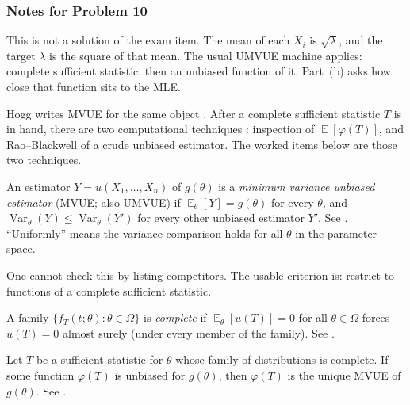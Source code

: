 \documentclass[11pt,a4paper]{article}
\DeclareMathOperator{\Var}{Var}
\DeclareMathOperator{\E}{\mathbb{E}}
\begin{document}
\setcounter{section}{10}
\setcounter{definition}{0}

\subsubsection{Notes for Problem 10}

This is not a solution of the exam item. The mean of each \(X_i\) is \(\sqrt{\lambda}\), and the target \(\lambda\) is the square of that mean. The usual UMVUE machine applies: complete sufficient statistic, then an unbiased function of it. Part~(b) asks how close that function sits to the MLE.

Hogg writes MVUE for the same object \citep[Definition~7.1.1]{hogg2019}. After a complete sufficient statistic \(T\) is in hand, there are two computational techniques \citep[\S7.6]{hogg2019}: inspection of \(\E[\varphi(T)]\), and Rao--Blackwell of a crude unbiased estimator. The worked items below are those two techniques.

\begin{definition}
\label{def:mvue}
An estimator \(Y=u(X_1,\dots,X_n)\) of \(g(\theta)\) is a \emph{minimum variance unbiased estimator} (MVUE; also UMVUE) if \(\E_\theta[Y]=g(\theta)\) for every \(\theta\), and \(\Var_\theta(Y)\le\Var_\theta(Y')\) for every other unbiased estimator \(Y'\). See \citep[Definition~7.1.1]{hogg2019}. ``Uniformly'' means the variance comparison holds for all \(\theta\) in the parameter space.
\end{definition}

One cannot check this by listing competitors. The usable criterion is: restrict to functions of a complete sufficient statistic.

\begin{definition}[Completeness]
\label{def:complete}
A family \(\{f_T(t;\theta):\theta\in\Omega\}\) is \emph{complete} if \(\E_\theta[u(T)]=0\) for all \(\theta\in\Omega\) forces \(u(T)=0\) almost surely (under every member of the family). See \citep[\S7.4]{hogg2019}.
\end{definition}

\begin{theorem}
\label{thm:ls}
Let \(T\) be a sufficient statistic for \(\theta\) whose family of distributions is complete. If some function \(\varphi(T)\) is unbiased for \(g(\theta)\), then \(\varphi(T)\) is the unique MVUE of \(g(\theta)\). See \citep[Theorem~7.4.1]{hogg2019}.
\end{theorem}
\end{document}

